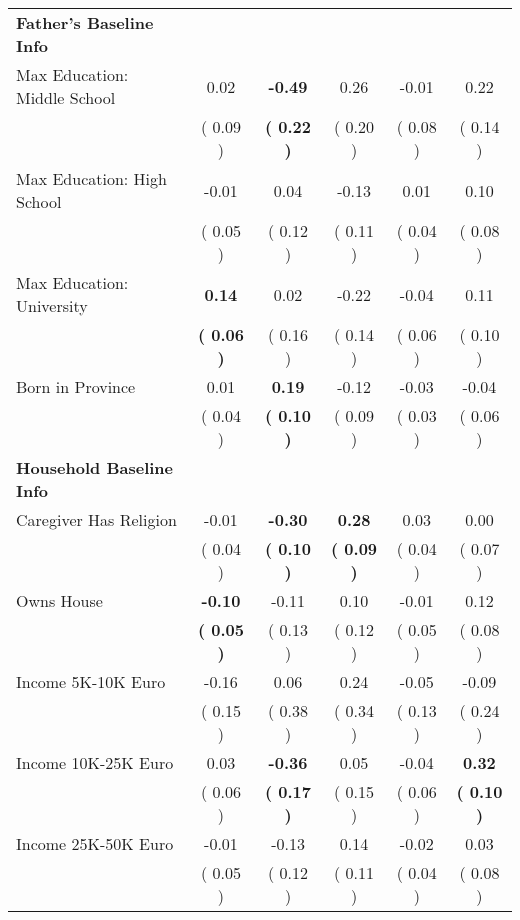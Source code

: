 \begin{table}[H]
{\begin{tabular}{lccccc}
\midrule
\textbf{Father's Baseline Info} \\
\quad Max Education: Middle School &      0.02 & \textbf{    -0.49} &      0.26 &     -0.01 &      0.22 \\
\quad  & (     0.09 ) & \textbf{(     0.22 )}  & (     0.20 )  & (     0.08 ) & (     0.14 ) \\
\quad Max Education: High School &     -0.01 &      0.04 &     -0.13 &      0.01 &      0.10 \\
\quad  & (     0.05 ) & (     0.12 )  & (     0.11 )  & (     0.04 ) & (     0.08 ) \\
\quad Max Education: University & \textbf{     0.14} &      0.02 &     -0.22 &     -0.04 &      0.11 \\
\quad  & \textbf{(     0.06 )} & (     0.16 )  & (     0.14 )  & (     0.06 ) & (     0.10 ) \\
\quad Born in Province &      0.01 & \textbf{     0.19} &     -0.12 &     -0.03 &     -0.04 \\
\quad  & (     0.04 ) & \textbf{(     0.10 )}  & (     0.09 )  & (     0.03 ) & (     0.06 ) \\
\midrule
\textbf{Household Baseline Info} \\
\quad Caregiver Has Religion &     -0.01 & \textbf{    -0.30} & \textbf{     0.28} &      0.03 &      0.00 \\
\quad  & (     0.04 ) & \textbf{(     0.10 )}  & \textbf{(     0.09 )}  & (     0.04 ) & (     0.07 ) \\
\quad Owns House & \textbf{    -0.10} &     -0.11 &      0.10 &     -0.01 &      0.12 \\
\quad  & \textbf{(     0.05 )} & (     0.13 )  & (     0.12 )  & (     0.05 ) & (     0.08 ) \\
\quad Income 5K-10K Euro &     -0.16 &      0.06 &      0.24 &     -0.05 &     -0.09 \\
\quad  & (     0.15 ) & (     0.38 )  & (     0.34 )  & (     0.13 ) & (     0.24 ) \\
\quad Income 10K-25K Euro &      0.03 & \textbf{    -0.36} &      0.05 &     -0.04 & \textbf{     0.32} \\
\quad  & (     0.06 ) & \textbf{(     0.17 )}  & (     0.15 )  & (     0.06 ) & \textbf{(     0.10 )} \\
\quad Income 25K-50K Euro &     -0.01 &     -0.13 &      0.14 &     -0.02 &      0.03 \\
\quad  & (     0.05 ) & (     0.12 )  & (     0.11 )  & (     0.04 ) & (     0.08 ) \\

\end{tabular}}
\end{table}
